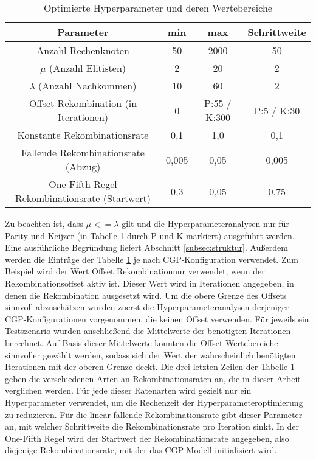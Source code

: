 \begin{table}[h]
	\centering
	\begin{tabular}{c | c | c | c}
		\textbf{Parameter} & \textbf{min} & \textbf{max} & \textbf{Schrittweite}\\
		\hline
		Anzahl Rechenknoten & 50 & 2000 & 50 \\
		\hline
		$\mu$ (Anzahl Elitisten) & 2 & 20 & 2\\
		\hline
		$\lambda$ (Anzahl Nachkommen) & 10 & 60 & 2 \\
		\hline
		Offset Rekombination (in Iterationen)& 0 & P:55 / K:300 & P:5 / K:30\\
		\hline
		Konstante Rekombinationsrate & 0,1 & 1,0 & 0,1\\
		\hline
		Fallende Rekombinationsrate (Abzug) & 0,005 & 0,05 & 0,005\\
		\hline
		One-Fifth Regel Rekombinationsrate (Startwert) & 0,3 & 0,05 & 0,75\\
	\end{tabular}
	\caption{Optimierte Hyperparameter und deren Wertebereiche}
	\label{table:hyperopt}
\end{table}

Zu beachten ist, dass $\mu <= \lambda$ gilt und die Hyperparameteranalysen nur für Parity und Keijzer (in Tabelle \ref{table:hyperopt} durch P und K markiert) ausgeführt werden.
Eine ausführliche Begründung liefert Abschnitt \ref{subsec:struktur}.
Außerdem werden die Einträge der Tabelle \ref{table:hyperopt} je nach CGP-Konfiguration verwendet.
Zum Beispiel wird der Wert \glqq Offset Rekombination\grqq\space nur verwendet, wenn der Rekombinationsoffset aktiv ist. 
Dieser Wert wird in Iterationen angegeben, in denen die Rekombination ausgesetzt wird.
Um die obere Grenze des Offsets sinnvoll abzuschätzen wurden zuerst die Hyperparameteranalysen derjeniger CGP-Konfigurationen vorgenommen, die keinen Offset verwenden.
Für jeweils ein Testszenario wurden anschließend die Mittelwerte der benötigten Iterationen berechnet.
Auf Basis dieser Mittelwerte konnten die Offset Wertebereiche sinnvoller gewählt werden, sodass sich der Wert der wahrscheinlich benötigten Iterationen mit der oberen Grenze deckt.
Die drei letzten Zeilen der Tabelle \ref{table:hyperopt} geben die verschiedenen Arten an Rekombinationsraten an, die in dieser Arbeit verglichen werden.
Für jede dieser Ratenarten wird gezielt nur ein Hyperparameter verwendet, um die Rechenzeit der Hyperparameteroptimierung zu reduzieren.
Für die linear fallende Rekombinationsrate gibt dieser Parameter an, mit welcher Schrittweite die Rekombinationsrate pro Iteration sinkt.
In der One-Fifth Regel wird der Startwert der Rekombinationsrate angegeben, also diejenige Rekombinationsrate, mit der das CGP-Modell initialisiert wird.\\

